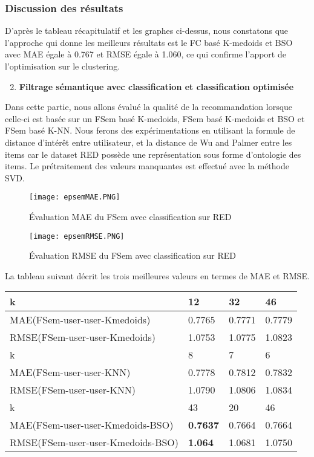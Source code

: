 \subsubsection*{Discussion des résultats}
D'après le tableau récapitulatif et les graphes ci-dessus, nous constatons que l'approche qui donne les meilleurs résultats est le FC basé K-medoids et BSO avec MAE égale à 0.767 et RMSE égale à 1.060, ce qui confirme l'apport de l'optimisation sur le clustering.\\


\begin{enumerate}[nosep,label=\textbf{\arabic*)}]
	\setcounter{enumi}{1}
	\item \textbf{Filtrage sémantique  avec classification et classification optimisée}
\end{enumerate}\mbox{} \indent Dans cette partie, nous allons évalué la qualité de la recommandation lorsque celle-ci est basée sur un FSem basé K-medoids, FSem basé K-medoids et BSO et FSem basé K-NN.  Nous ferons des expérimentations en utilisant la formule de distance d'intérêt entre utilisateur, et la distance de Wu and Palmer entre les items car le dataset RED possède une représentation sous forme d'ontologie des items.
Le prétraitement des valeurs manquantes est effectué avec la méthode SVD.
\begin{figure}[H]
	\centering
	\texttt{[image: epsemMAE.PNG]}
	\caption{Évaluation MAE du FSem avec classification sur RED}
	\label{fig:epsemMAE}
\end{figure}

\begin{figure}[H]
	\centering
	\texttt{[image: epsemRMSE.PNG]}
	\caption{Évaluation RMSE du FSem avec classification sur RED}
	\label{fig:epsemRMSE}
\end{figure}
La tableau suivant décrit les trois meilleures valeurs en termes de MAE et RMSE.
\begin{table}[H]
	\centering
	\begin{tabular}{|l|l|l|l|}
		\hline
		k & 12 & 32 & 46 \\ \hline
		MAE(FSem-user-user-Kmedoids) & 0.7765& 0.7771 & 0.7779\\ \hline
		RMSE(FSem-user-user-Kmedoids) & 1.0753 & 1.0775 & 1.0823 \\ \hline\hline
		k & 8 & 7 & 6 \\ \hline
		MAE(FSem-user-user-KNN) & 0.7778 & 0.7812 & 0.7832 \\ \hline
		RMSE(FSem-user-user-KNN) & 1.0790 & 1.0806 & 1.0834 \\ \hline\hline
		k & 43 & 20 & 46 \\ \hline
		MAE(FSem-user-user-Kmedoids-BSO) & \textbf{0.7637} & 0.7664 & 0.7664 \\ \hline
		RMSE(FSem-user-user-Kmedoids-BSO) & \textbf{1.064} & 1.0681 & 1.0750 \\ \hline
	\end{tabular}
\end{table}
